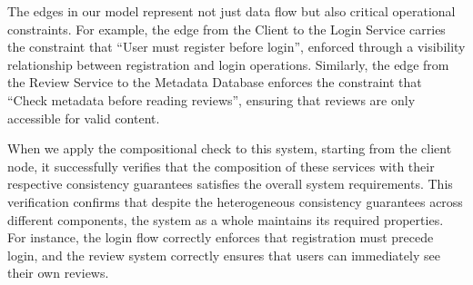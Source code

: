 The edges in our model represent not just data flow but also critical
operational constraints. For example, the edge from the Client to the
Login Service carries the constraint that ``User must register before
login'', enforced through a visibility relationship between
registration and login operations. Similarly, the edge from the
Review Service to the Metadata Database enforces the constraint that
``Check metadata before reading reviews'', ensuring that reviews are only
accessible for valid content.

When we apply the compositional check to this system,
starting from the client node, it successfully verifies that the
composition of these services with their respective consistency
guarantees satisfies the overall system requirements.
This verification confirms that despite the heterogeneous consistency
guarantees across different components, the system as a whole
maintains its required properties.
For instance, the login flow
correctly enforces that registration must precede login, and the
review system correctly ensures that users can immediately see their
own reviews. %

